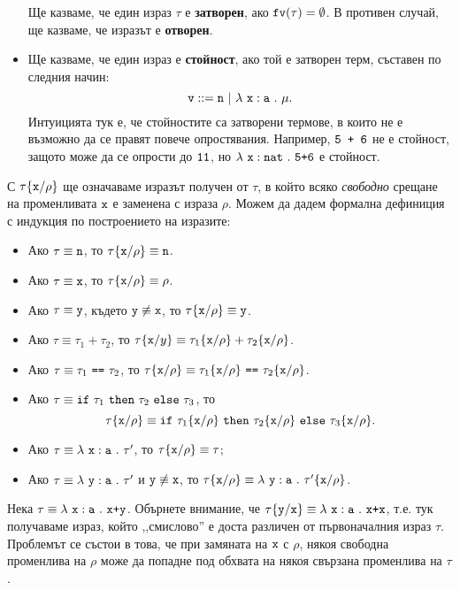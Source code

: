 \begin{itemize}
  Ще казваме, че един израз $\tau$ е {\bf затворен}, ако $\texttt{fv}(\tau) = \emptyset$.
  В противен случай, ще казваме, че изразът е {\bf отворен}.
\item
  Ще казваме, че един израз е {\bf стойност}, ако той е затворен терм, съставен по следния начин:
  \[\texttt{v} ::= \texttt{n}\ |\ \lambda~\texttt{x}:\texttt{a}~.~{\mu}.\]
  Интуицията тук е, че стойностите са затворени термове, в които не е възможно да се правят повече опростявания.
  Например, $\texttt{5 + 6}$ не е стойност, защото може да се опрости до $\texttt{11}$,
  но $\lambda~\texttt{x}:\texttt{nat}~.~{\texttt{5+6}}$ е стойност.
\end{itemize}

С $\tau\{\texttt{x}/{\rho}\}$ ще означаваме изразът получен от $\tau$, в който всяко \emph{свободно} срещане на променливата $\texttt{x}$
е заменена с израза $\rho$. Можем да дадем формална дефиниция с индукция по построението на изразите:
\begin{itemize}
\item
  Ако $\tau \equiv \texttt{n}$, то $\tau\{\texttt{x}/{\rho}\} \equiv \texttt{n}$.
\item
  Ако $\tau \equiv \texttt{x}$, то $\tau\{\texttt{x}/{\rho}\} \equiv \rho$.
\item
  Ако $\tau \equiv \texttt{y}$, където $\texttt{y} \not\equiv \texttt{x}$, то $\tau\{\texttt{x}/{\rho}\} \equiv \texttt{y}$.
\item
  Ако $\tau \equiv \tau_1 + \tau_2$, то $\tau\{\texttt{x}/{y}\} \equiv \tau_1\{\texttt{x}/{\rho}\} + \tau_2\{\texttt{x}/{\rho}\}$.
\item
  Ако $\tau \equiv \tau_1\ \vv{==}\ \tau_2$, то $\tau\rename{x}{\rho} \equiv \tau_1\rename{x}{\rho}\ \vv{==}\ \tau_2\rename{x}{\rho}$.
\item
  Ако $\tau \equiv \texttt{if}\ \tau_1\ \texttt{then}\ \tau_2\ \texttt{else}\ \tau_3$, то
  \[\tau\{\texttt{x}/{\rho}\} \equiv \texttt{if}\ \tau_1\{\texttt{x}/{\rho}\}\ \texttt{then}\ \tau_2\{\texttt{x}/{\rho}\}\ \texttt{else}\ \tau_3\{\texttt{x}/{\rho}\}.\]
\item
  Ако $\tau \equiv \lambda~\texttt{x}:\texttt{a}~.~{\tau'}$, то $\tau\{\texttt{x}/{\rho}\} \equiv \tau$;
\item
  Ако $\tau \equiv \lambda~\texttt{y}:\texttt{a}~.~{\tau'}$ и $\texttt{y} \not\equiv \texttt{x}$, то
  $\tau\{\texttt{x}/{\rho}\} \equiv \lambda~\texttt{y}:\texttt{a}~.~{\tau'\{\texttt{x}/{\rho}\}}$.
\end{itemize}

Нека $\tau \equiv \lambda~\texttt{x}:\texttt{a}~.~{\texttt{x+y}}$. Обърнете внимание, че $\tau\{\texttt{y}/{\texttt{x}}\} \equiv \lambda~\texttt{x}:\texttt{a}~.~{\texttt{x+x}}$,
т.е. тук получаваме израз, който ,,смислово'' е доста различен от първоначалния израз $\tau$.
Проблемът се състои в това, че при замяната на $\texttt{x}$ с $\rho$, някоя свободна променлива на $\rho$ може да попадне под обхвата на някоя свързана
променлива на $\tau$.

